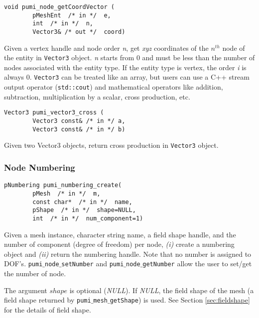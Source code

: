 \begin{verbatim}
void pumi_node_getCoordVector (
        pMeshEnt  /* in */  e,
        int  /* in */  n,
        Vector3& /* out */  coord)
\end{verbatim}\vspace{-.5cm}\hspace{1cm}
	Given a vertex handle and node order \emph{n}, get \emph{xyz} coordinates of the $n^{th}$ node of the entity in \texttt{Vector3} object. \emph{n} starts from $0$ and must be less than the number of nodes associated with the entity type. If the entity type is vertex, the order \emph{i} is always $0$. \texttt{Vector3} can be treated like an array, but users can use a C++ stream output operator (\texttt{std::cout}) and mathematical operators like addition, subtraction, multiplication by a scalar, cross production, etc. 

\begin{verbatim}
Vector3 pumi_vector3_cross (
        Vector3 const& /* in */ a, 
        Vector3 const& /* in */ b)
\end{verbatim}\vspace{-.5cm}\hspace{1cm}
Given two Vector3 objects, return cross production in \texttt{Vector3} object.

\subsubsection{Node Numbering}
\begin{verbatim}
pNumbering pumi_numbering_create(
        pMesh  /* in */  m,
        const char*  /* in */  name,
        pShape  /* in */  shape=NULL,
        int  /* in */  num_component=1)
\end{verbatim}\vspace{-.5cm}\hspace{1cm}
Given a mesh instance, character string name, a field shape handle, and the number of component (degree of freedom) per  node, \emph{(i)} create a numbering object and \emph{(ii)} return the numbering handle. 
Note that no number is assigned to DOF's. \texttt{pumi$\_$node$\_$setNumber} and \texttt{pumi$\_$node$\_$getNumber} allow the user to set/get the number of node.

The argument $shape$ is optional (\emph{NULL}). If \emph{NULL}, the field shape of the mesh 
(a field shape returned by \texttt{pumi$\_$mesh$\_$getShape}) is used. See Section \ref{sec:fieldshape} for the details of field shape.

